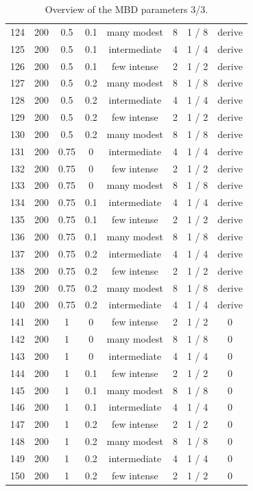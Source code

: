 \documentclass{article}
\begin{document}
\begin{table}
\begin{tabular}{ l | c | c | c | c   c   c | c }
124 & 200 & 0.5 & 0.1 & many modest  & 8 & 1 / 8 & derive \\
125 & 200 & 0.5 & 0.1 & intermediate & 4 & 1 / 4 & derive \\
126 & 200 & 0.5 & 0.1 & few intense & 2 & 1 / 2 & derive \\
127 & 200 & 0.5 & 0.2 & many modest  & 8 & 1 / 8 & derive \\
128 & 200 & 0.5 & 0.2 & intermediate & 4 & 1 / 4 & derive \\
129 & 200 & 0.5 & 0.2 & few intense & 2 & 1 / 2 & derive \\
130 & 200 & 0.5 & 0.2 & many modest  & 8 & 1 / 8 & derive \\
131 & 200 & 0.75 & 0 & intermediate & 4 & 1 / 4 & derive \\
132 & 200 & 0.75 & 0 & few intense & 2 & 1 / 2 & derive \\
133 & 200 & 0.75 & 0 & many modest  & 8 & 1 / 8 & derive \\
134 & 200 & 0.75 & 0.1 & intermediate & 4 & 1 / 4 & derive \\
135 & 200 & 0.75 & 0.1 & few intense & 2 & 1 / 2 & derive \\
136 & 200 & 0.75 & 0.1 & many modest  & 8 & 1 / 8 & derive \\
137 & 200 & 0.75 & 0.2 & intermediate & 4 & 1 / 4 & derive \\
138 & 200 & 0.75 & 0.2 & few intense & 2 & 1 / 2 & derive \\
139 & 200 & 0.75 & 0.2 & many modest  & 8 & 1 / 8 & derive \\
140 & 200 & 0.75 & 0.2 & intermediate & 4 & 1 / 4 & derive \\
141 & 200 & 1 & 0 & few intense & 2 & 1 / 2 & 0 \\
142 & 200 & 1 & 0 & many modest  & 8 & 1 / 8 & 0 \\
143 & 200 & 1 & 0 & intermediate & 4 & 1 / 4 & 0 \\
144 & 200 & 1 & 0.1 & few intense & 2 & 1 / 2 & 0 \\
145 & 200 & 1 & 0.1 & many modest  & 8 & 1 / 8 & 0 \\
146 & 200 & 1 & 0.1 & intermediate & 4 & 1 / 4 & 0 \\
147 & 200 & 1 & 0.2 & few intense & 2 & 1 / 2 & 0 \\
148 & 200 & 1 & 0.2 & many modest  & 8 & 1 / 8 & 0 \\
149 & 200 & 1 & 0.2 & intermediate & 4 & 1 / 4 & 0 \\
150 & 200 & 1 & 0.2 & few intense & 2 & 1 / 2 & 0 \\
    \hline
  \end{tabular}
  \caption{
    Overview of the MBD parameters 3/3. 
  }
  \label{table:mbd_parameters_3}
\end{table}



\end{document}
